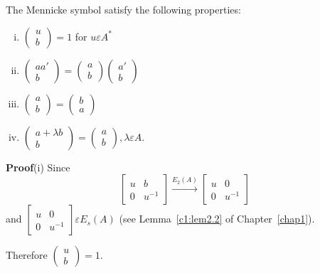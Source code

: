 \begin{Prop}\label{c2:Prop3.5}
The Mennicke symbol satisfy the following properties: 
\begin{enumerate}[(i)]
\item $\begin{pmatrix}
u\\
b
\end{pmatrix}=1$ for $u\varepsilon A^{\ast}$
\item $\begin{pmatrix}
aa'\\
b
\end{pmatrix} = \begin{pmatrix}
a\\
b 
\end{pmatrix} \begin{pmatrix}
a'\\
b 
\end{pmatrix}$
\item $\begin{pmatrix}
a\\
b 
\end{pmatrix} = \begin{pmatrix}
b\\
a
\end{pmatrix}$
\item $\begin{pmatrix}
a+\lambda b\\
b
\end{pmatrix} = \begin{pmatrix}
a\\
b 
\end{pmatrix}, \lambda \varepsilon A$.
\end{enumerate}
\end{Prop}

\textbf{Proof}(i) Since
$$
\begin{bmatrix}
u & b\\
0 & u^{-1}
\end{bmatrix} \xrightarrow{E_2(A)} \begin{bmatrix}
u & 0\\
0 & u^{-1}
\end{bmatrix}
$$
and $\begin{bmatrix}
u & 0\\
0 & u^{-1}
\end{bmatrix} \varepsilon E_s(A)$ (see Lemma~\ref{c1:lem2.2} of
Chapter~\ref{chap1}).

Therefore $\begin{pmatrix}
u\\
b
\end{pmatrix}=1$.

